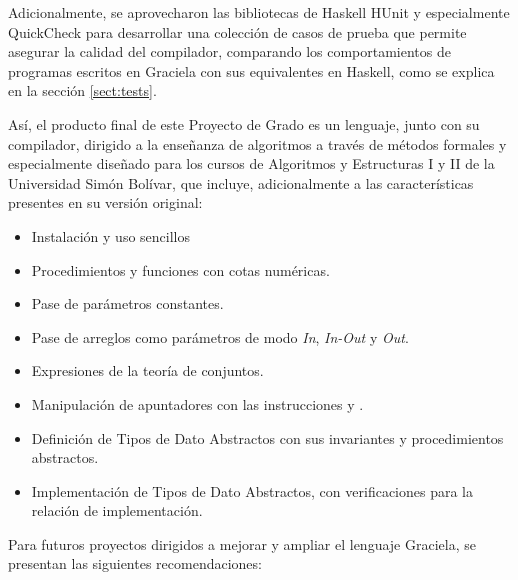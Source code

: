 Adicionalmente, se aprovecharon las bibliotecas de Haskell HUnit y especialmente
QuickCheck para desarrollar una colección de casos de prueba que permite
asegurar la calidad del compilador, comparando los comportamientos de programas
escritos en Graciela con sus equivalentes en Haskell, como se explica en la
sección \ref{sect:tests}.

Así, el producto final de este Proyecto de Grado es un lenguaje, junto con su
compilador, dirigido a la enseñanza de algoritmos a través de métodos formales y
especialmente diseñado para los cursos de Algoritmos y Estructuras I y II de la
Universidad Simón Bolívar, que incluye, adicionalmente a las características
presentes en su versión original:

\begin{itemize}
  \item Instalación y uso sencillos
  \item Procedimientos y funciones con cotas numéricas.
  \item Pase de parámetros constantes.
  \item Pase de arreglos como parámetros de modo \textit{In}, \textit{In-Out} y \textit{Out}.
  \item Expresiones de la teoría de conjuntos.
  \item Manipulación de apuntadores con las instrucciones  y .
  \item Definición de Tipos de Dato Abstractos con sus invariantes y procedimientos abstractos.
  \item Implementación de Tipos de Dato Abstractos, con verificaciones para la relación de implementación.
\end{itemize}

Para futuros proyectos dirigidos a mejorar y ampliar el lenguaje Graciela, se
presentan las siguientes recomendaciones:


